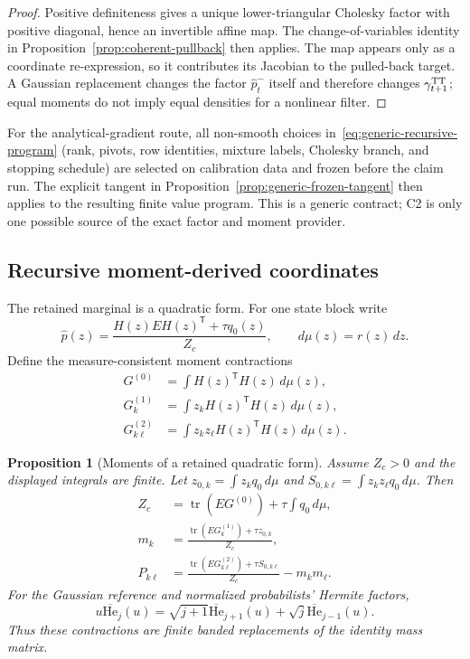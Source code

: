\documentclass[11pt]{article}
\newtheorem{proposition}{Proposition}
\begin{document}
\begin{proof}
Positive definiteness gives a unique lower-triangular Cholesky factor with
positive diagonal, hence an invertible affine map. The change-of-variables
identity in Proposition~\ref{prop:coherent-pullback} then applies. The map
appears only as a coordinate re-expression, so it contributes its Jacobian to
the pulled-back target. A Gaussian replacement changes the factor
$\widehat p_t^-$ itself and therefore changes $\gamma_{t+1}^{\rm TT}$; equal
moments do not imply equal densities for a nonlinear filter.
\end{proof}

For the analytical-gradient route, all non-smooth choices in~\eqref{eq:generic-recursive-program}
(rank, pivots, row identities, mixture labels, Cholesky branch, and stopping
schedule) are selected on calibration data and frozen before the claim run.
The explicit tangent in Proposition~\ref{prop:generic-frozen-tangent} then
applies to the resulting finite value program. This is a generic contract; C2
is only one possible source of the exact factor and moment provider.

\subsection{Recursive moment-derived coordinates}

The retained marginal is a quadratic form. For one state block write
\begin{equation}\label{eq:coherent-retained-marginal}
  \widehat p(z)=\frac{H(z)EH(z)^\mathsf T+\tau q_0(z)}{Z_c},
  \qquad d\mu(z)=r(z)\,dz.
\end{equation}
Define the measure-consistent moment contractions
\begin{align}
 G^{(0)}&=\int H(z)^\mathsf TH(z)\,d\mu(z),
 \label{eq:coherent-moment-g0}\\
 G^{(1)}_k&=\int z_kH(z)^\mathsf TH(z)\,d\mu(z),
 \label{eq:coherent-moment-g1}\\
 G^{(2)}_{k\ell}&=\int z_kz_\ell H(z)^\mathsf TH(z)\,d\mu(z).
 \label{eq:coherent-moment-g2}
\end{align}

\begin{proposition}[Moments of a retained quadratic form]
\label{prop:coherent-moments}
Assume $Z_c>0$ and the displayed integrals are finite. Let
$z_{0,k}=\int z_kq_0\,d\mu$ and
$S_{0,k\ell}=\int z_kz_\ell q_0\,d\mu$. Then
\begin{align}
 Z_c&=\operatorname{tr}(EG^{(0)})+\tau\int q_0\,d\mu,\label{eq:coherent-moment-z}\\
 m_k&=\frac{\operatorname{tr}(EG^{(1)}_k)+\tau z_{0,k}}{Z_c},\label{eq:coherent-moment-mean}\\
 P_{k\ell}&=\frac{\operatorname{tr}(EG^{(2)}_{k\ell})+\tau S_{0,k\ell}}{Z_c}-m_km_\ell.
 \label{eq:coherent-moment-cov}
\end{align}
For the Gaussian reference and normalized probabilists' Hermite factors,
\[
u\overline{\mathrm{He}}_j(u)=\sqrt{j+1}\overline{\mathrm{He}}_{j+1}(u)
+\sqrt{j}\overline{\mathrm{He}}_{j-1}(u).
\]
Thus these contractions are finite banded replacements of the identity mass
matrix.
\end{proposition}
\end{document}
